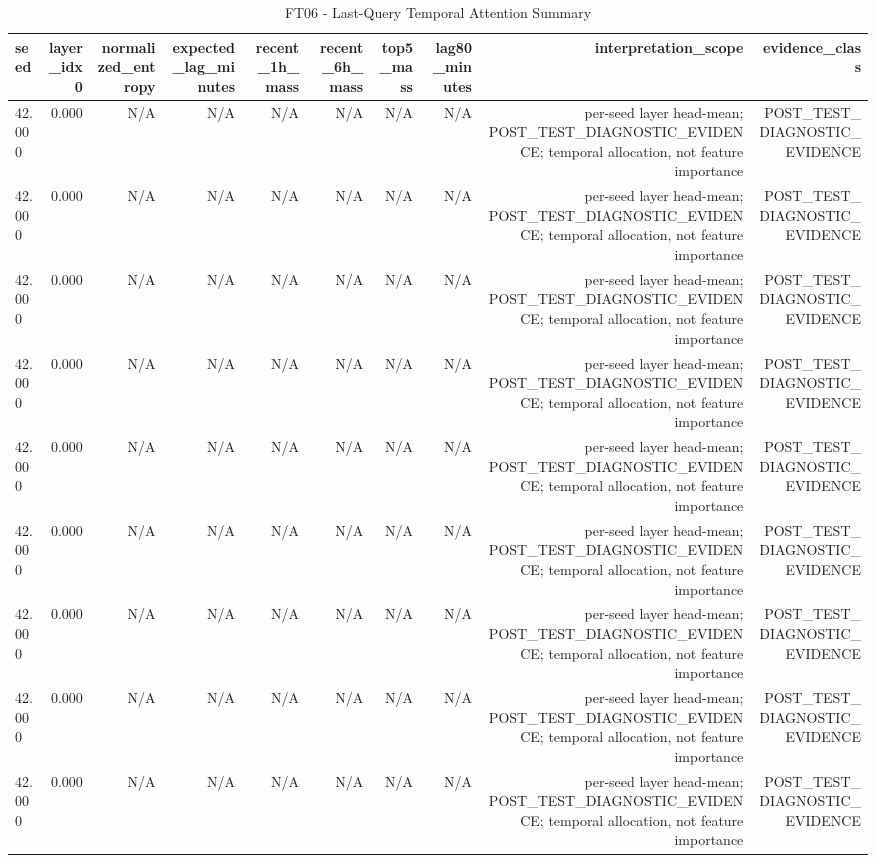 \begin{table}[h!]
\centering
\caption{FT06 - Last-Query Temporal Attention Summary}
\label{tab:ft06\_-\_last-query\_temporal\_attention\_summary}
\begin{tabular}{lrrrrrrrrr}
\toprule
seed & layer\_idx0 & normalized\_entropy & expected\_lag\_minutes & recent\_1h\_mass & recent\_6h\_mass & top5\_mass & lag80\_minutes & interpretation\_scope & evidence\_class \\
\midrule
42.000 & 0.000 & N/A & N/A & N/A & N/A & N/A & N/A & per-seed layer head-mean; POST\_TEST\_DIAGNOSTIC\_EVIDENCE; temporal allocation, not feature importance & POST\_TEST\_DIAGNOSTIC\_EVIDENCE \\
42.000 & 0.000 & N/A & N/A & N/A & N/A & N/A & N/A & per-seed layer head-mean; POST\_TEST\_DIAGNOSTIC\_EVIDENCE; temporal allocation, not feature importance & POST\_TEST\_DIAGNOSTIC\_EVIDENCE \\
42.000 & 0.000 & N/A & N/A & N/A & N/A & N/A & N/A & per-seed layer head-mean; POST\_TEST\_DIAGNOSTIC\_EVIDENCE; temporal allocation, not feature importance & POST\_TEST\_DIAGNOSTIC\_EVIDENCE \\
42.000 & 0.000 & N/A & N/A & N/A & N/A & N/A & N/A & per-seed layer head-mean; POST\_TEST\_DIAGNOSTIC\_EVIDENCE; temporal allocation, not feature importance & POST\_TEST\_DIAGNOSTIC\_EVIDENCE \\
42.000 & 0.000 & N/A & N/A & N/A & N/A & N/A & N/A & per-seed layer head-mean; POST\_TEST\_DIAGNOSTIC\_EVIDENCE; temporal allocation, not feature importance & POST\_TEST\_DIAGNOSTIC\_EVIDENCE \\
42.000 & 0.000 & N/A & N/A & N/A & N/A & N/A & N/A & per-seed layer head-mean; POST\_TEST\_DIAGNOSTIC\_EVIDENCE; temporal allocation, not feature importance & POST\_TEST\_DIAGNOSTIC\_EVIDENCE \\
42.000 & 0.000 & N/A & N/A & N/A & N/A & N/A & N/A & per-seed layer head-mean; POST\_TEST\_DIAGNOSTIC\_EVIDENCE; temporal allocation, not feature importance & POST\_TEST\_DIAGNOSTIC\_EVIDENCE \\
42.000 & 0.000 & N/A & N/A & N/A & N/A & N/A & N/A & per-seed layer head-mean; POST\_TEST\_DIAGNOSTIC\_EVIDENCE; temporal allocation, not feature importance & POST\_TEST\_DIAGNOSTIC\_EVIDENCE \\
42.000 & 0.000 & N/A & N/A & N/A & N/A & N/A & N/A & per-seed layer head-mean; POST\_TEST\_DIAGNOSTIC\_EVIDENCE; temporal allocation, not feature importance & POST\_TEST\_DIAGNOSTIC\_EVIDENCE \\

\end{tabular}
\end{table}
